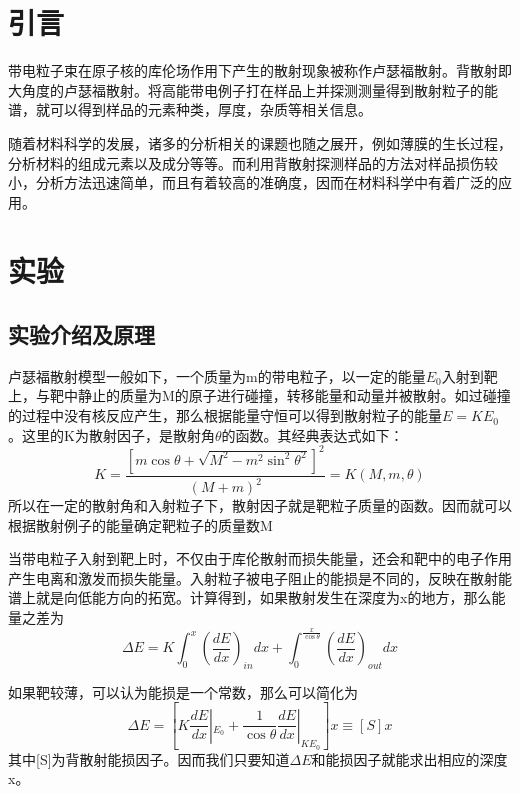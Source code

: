 \documentclass[a4paper,10.0pt,twoside]{npr}
\begin{document}
\begin{multicols}{2}

\section{引言}    %
\vspace*{-1mm}
\song\wuhao

带电粒子束在原子核的库伦场作用下产生的散射现象被称作卢瑟福散射。背散射即大角度的卢瑟福散射。将高能带电例子打在样品上并探测测量得到散射粒子的能谱，就可以得到样品的元素种类，厚度，杂质等相关信息。

随着材料科学的发展，诸多的分析相关的课题也随之展开，例如薄膜的生长过程，分析材料的组成元素以及成分等等。而利用背散射探测样品的方法对样品损伤较小，分析方法迅速简单，而且有着较高的准确度，因而在材料科学中有着广泛的应用。

\section{实验}
\subsection{实验介绍及原理}
卢瑟福散射模型一般如下，一个质量为m的带电粒子，以一定的能量$E_0$入射到靶上，与靶中静止的质量为M的原子进行碰撞，转移能量和动量并被散射。如过碰撞的过程中没有核反应产生，那么根据能量守恒可以得到散射粒子的能量$E=KE_0$。这里的K为散射因子，是散射角$\theta$的函数。其经典表达式如下：
\begin{equation}
	K=\frac{[m\cos{\theta}+\sqrt{M^2-m^2\sin^2\theta^2}]^2}{(M+m)^2}=K(M,m,\theta)
\end{equation}
所以在一定的散射角和入射粒子下，散射因子就是靶粒子质量的函数。因而就可以根据散射例子的能量确定靶粒子的质量数M


当带电粒子入射到靶上时，不仅由于库伦散射而损失能量，还会和靶中的电子作用产生电离和激发而损失能量。入射粒子被电子阻止的能损是不同的，反映在散射能谱上就是向低能方向的拓宽。计算得到，如果散射发生在深度为x的地方，那么能量之差为
\begin{equation}
	\Delta E = K\int_0^x(\frac{dE}{dx})_{in}dx+\int_0^{\frac{x}{\cos\theta}}(\frac{dE}{dx})_{out}dx
\end{equation}

如果靶较薄，可以认为能损是一个常数，那么可以简化为
\begin{equation}
	\Delta E=[K\frac{dE}{dx}|_{E_0}+\frac{1}{\cos\theta}\frac{dE}{dx}|_{KE_0}]x\equiv[S]x
\end{equation}
其中[S]为背散射能损因子。因而我们只要知道$\Delta E$和能损因子就能求出相应的深度x。


\end{multicols}
\end{document}
